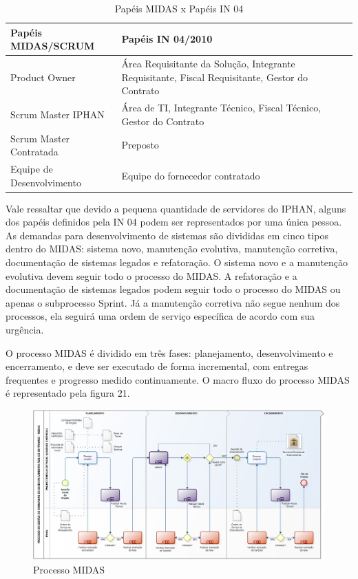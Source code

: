 \begin{anexosenv}
\begin{table}[htb]
\center
\footnotesize
\begin{tabular}{|p{6cm}|p{6cm}|}
  \hline
   \textbf{Papéis MIDAS/SCRUM} & \textbf{Papéis IN 04/2010}\\
    \hline
   Product Owner & Área Requisitante da Solução, Integrante Requisitante, Fiscal Requisitante, Gestor do Contrato\\
   \hline    
    Scrum Master IPHAN & Área de TI, Integrante Técnico, Fiscal Técnico, Gestor do Contrato\\
    \hline
   Scrum Master Contratada & Preposto\\
   \hline
    Equipe de Desenvolvimento & Equipe do fornecedor contratado\\
   \hline
\end{tabular}
\caption{Papéis MIDAS x Papéis IN 04}
\end{table}

Vale ressaltar que devido a pequena quantidade de servidores do IPHAN, alguns dos papéis definidos pela IN 04  podem ser representados por uma única pessoa.
As demandas para desenvolvimento de sistemas são divididas em cinco tipos dentro do MIDAS: sistema novo, manutenção evolutiva, manutenção corretiva, documentação de sistemas legados e refatoração.  O sistema novo e a manutenção evolutiva devem seguir todo o processo do MIDAS. A refatoração e a documentação de sistemas legados podem seguir todo o processo do MIDAS ou apenas o subprocesso Sprint. Já a manutenção corretiva não segue nenhum dos processos, ela seguirá uma ordem de serviço específica de acordo com sua urgência.

O processo MIDAS é dividido em três fases: planejamento, desenvolvimento e encerramento, e deve ser executado de forma incremental, com entregas frequentes e progresso medido continuamente. O macro fluxo do processo MIDAS é representado pela figura 21.

\begin{figure}[h]
		\centering
		\label{fig01}
			\includegraphics[scale=0.3]{figuras/processoMIDAS.png}
		\caption{Processo MIDAS \cite{IPHAN:2013}}
\end{figure}


\end{anexosenv}
